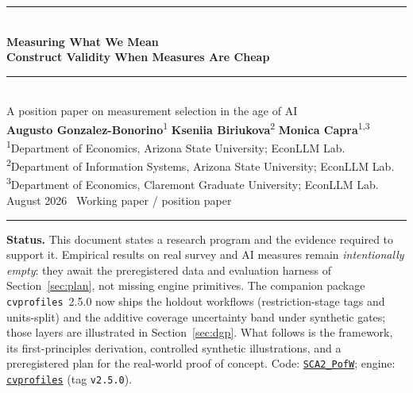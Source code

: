\documentclass[10pt,letterpaper]{article}
\newcommand{\cvp}{\texttt{cvprofiles}}
\begin{document}
\thispagestyle{empty}
\begin{center}
\vspace*{1.1cm}
{\color{econblue}\rule{\textwidth}{1.15pt}}\\[0.45em]
{\LARGE\bfseries\color{econblue} Measuring What We Mean}\\[0.16em]
{\LARGE\bfseries\color{econblue} Construct Validity When Measures Are Cheap}\\[0.45em]
{\color{econblue}\rule{\textwidth}{0.55pt}}\\[0.75em]
{\large A position paper on measurement selection in the age of AI}\\[0.95em]
{\large\textbf{Augusto Gonzalez-Bonorino}\textsuperscript{1}\quad
\textbf{Kseniia Biriukova}\textsuperscript{2}\quad
\textbf{Monica Capra}\textsuperscript{1,3}}\\[0.5em]
{\small\textsuperscript{1}Department of Economics, Arizona State University; EconLLM Lab.\\
\textsuperscript{2}Department of Information Systems, Arizona State University; EconLLM Lab.\\
\textsuperscript{3}Department of Economics, Claremont Graduate University; EconLLM Lab.}\\[0.75em]
{\normalsize August 2026 \textperiodcentered\ Working paper / position paper}\\[0.35em]
{\color{econblue}\rule{0.28\textwidth}{0.35pt}}
\end{center}

\vspace{0.6em}
\noindent\colorbox{mist}{\parbox{0.965\textwidth}{\small\vspace{0.3em}
\textbf{Status.} This document states a research program and the evidence required to support it.
Empirical results on real survey and AI measures remain \emph{intentionally empty}: they await the preregistered data and evaluation harness of Section~\ref{sec:plan}, not missing engine primitives.
The companion package \cvp{}~2.5.0 now ships the holdout workflows (restriction-stage tags and units-split) and the additive coverage uncertainty band under synthetic gates; those layers are illustrated in Section~\ref{sec:dgp}.
What follows is the framework, its first-principles derivation, controlled synthetic illustrations, and a preregistered plan for the real-world proof of concept.
Code: \href{https://github.com/EconLLM-Lab/SCA2_PofW}{\texttt{SCA2\_PofW}}; engine: \href{https://github.com/Bonorinoa/cvprofiles}{\texttt{cvprofiles}} (tag \texttt{v2.5.0}).
\vspace{0.3em}}}
\end{document}
